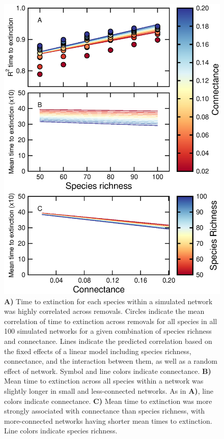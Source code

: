 \documentclass[12pt]{article}
\begin{document}
\begin{spacing}{2.0}
		\begin{figure}[hb!]
		    \centering
			\includegraphics[height=.75\textheight]{figures/extinction_order/extorder_correlations.eps}
			\caption{\textbf{A)} Time to extinction for each species within a simulated network was highly correlated across removals. Circles indicate the mean correlation of time to extinction across removals for all species in all 100 simulated networks for a given combination of species richness and connectance. Lines indicate the predicted correlation based on the fixed effects of a linear model including species richness, connectance, and the interaction between them, as well as a random effect of network. Symbol and line colors indicate connectance. \textbf{B)} Mean time to extinction across all species within a network was slightly longer in small and less-connected networks. As in \textbf{A)}, line colors indicate connectance. \textbf{C)} Mean time to extinction was more strongly associated with connectance than species richness, with more-connected networks having shorter mean times to extinction. Line colors indicate species richness.}
			\label{extorder_corrs}
			\end{figure}		


\end{spacing}
\end{document}
